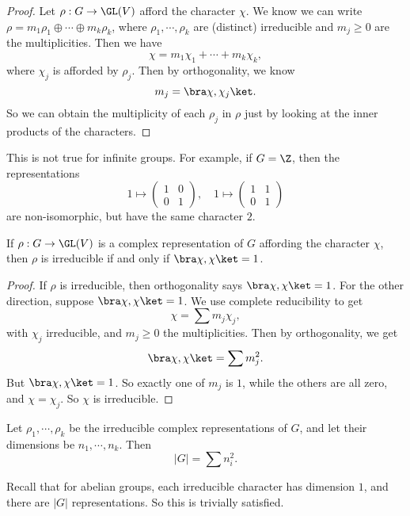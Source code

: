 \documentclass[a4paper]{article}
\begin{document}
\begin{proof}
  Let $\rho: G \to \GL(V)$ afford the character $\chi$. We know we can write $\rho = m_1 \rho_1 \oplus \cdots \oplus m_k \rho_k$, where $\rho_1, \cdots, \rho_k$ are (distinct) irreducible and $m_j \geq 0$ are the multiplicities. Then we have
  \[
    \chi = m_1 \chi_1 + \cdots + m_k \chi_k,
  \]
  where $\chi_j$ is afforded by $\rho_j$. Then by orthogonality, we know
  \[
    m_j = \bra \chi, \chi_j\ket.
  \]
  So we can obtain the multiplicity of each $\rho_j$ in $\rho$ just by looking at the inner products of the characters.
\end{proof}
This is not true for infinite groups. For example, if $G = \Z$, then the representations
\[
  1 \mapsto
  \begin{pmatrix}
    1 & 0\\
    0 & 1
  \end{pmatrix},\quad
  1 \mapsto
  \begin{pmatrix}
    1 & 1\\
    0 & 1
  \end{pmatrix}
\]
are non-isomorphic, but have the same character $2$.

\begin{cor}
  If $\rho: G \to \GL(V)$ is a complex representation of $G$ affording the character $\chi$, then $\rho$ is irreducible if and only if $\bra \chi, \chi \ket = 1$.
\end{cor}

\begin{proof}
  If $\rho$ is irreducible, then orthogonality says $\bra \chi, \chi \ket = 1$. For the other direction, suppose $\bra \chi, \chi\ket = 1$. We use complete reducibility to get
  \[
    \chi = \sum m_j \chi_j,
  \]
  with $\chi_j$ irreducible, and $m_j \geq 0$ the multiplicities. Then by orthogonality, we get
  \[
    \bra \chi, \chi\ket = \sum m_j^2.
  \]
  But $\bra \chi, \chi\ket = 1$. So exactly one of $m_j$ is $1$, while the others are all zero, and $\chi = \chi_j$. So $\chi$ is irreducible.
\end{proof}

\begin{thm}
  Let $\rho_1, \cdots, \rho_k$ be the irreducible complex representations of $G$, and let their dimensions be $n_1, \cdots, n_k$. Then
  \[
    |G| = \sum n_i^2.
  \]
\end{thm}
Recall that for abelian groups, each irreducible character has dimension $1$, and there are $|G|$ representations. So this is trivially satisfied.
\end{document}

